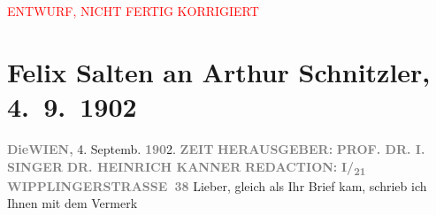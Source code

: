 
\begin{center}
            \textcolor{red}{ENTWURF, NICHT FERTIG KORRIGIERT}
                      \end{center}
            
         
         \renewcommand{\erwaehntePersonen}{Personen: Heinrich Kanner, Isidor Singer}
         \renewcommand{\erwaehnteInstitutionen}{Institutionen: Die Zeit}
         \renewcommand{\erwaehnteOrte}{Orte: Wien, Wipplingerstraße}
         \renewcommand{\erwaehnteWerke}{Werke: Die griechische Tänzerin. Novellette, Die kleine Veronika. Novelle}
               \section[Felix Salten an Arthur Schnitzler, 4. 9. 1902]{ Felix Salten an Arthur Schnitzler, 4. 9. 1902}\nopagebreak{}\rehead{ }\begin{ledgroupsized}[t]{13cm}\normalsize\beginnumbering \toendnotes[C]{\smallbreak\pagebreak[2]} 
\toendnotes[C]{\smallbreak}\pstart
           \noindent{}{\pb}\textcolor{gray}{\textbf{Die}}\hfill \textcolor{gray}{\textbf{WIEN,}}{ }4. Septemb. \textcolor{gray}{\textbf{190}}2.\pend
           \pstart
           \textcolor{gray}{\textbf{ZEIT}}\pend
           \pstart
           \textcolor{gray}{\textbf{HERAUSGEBER:}}\pend
           \pstart
           \textcolor{gray}{\textbf{PROF. DR. I. SINGER}}\pend
           \pstart
           \textcolor{gray}{\textbf{DR. HEINRICH KANNER}}\pend
           \pstart
           \textcolor{gray}{\textbf{REDACTION:}}\pend
           \pstart
           \textcolor{gray}{\textbf{I/\textsubscript{21}
                           WIPPLINGERSTRASSE 38}}\pend
           \pstart
           Lieber, gleich als Ihr Brief kam, schrieb ich Ihnen mit dem Vermerk

\end{ledgroupsized}
